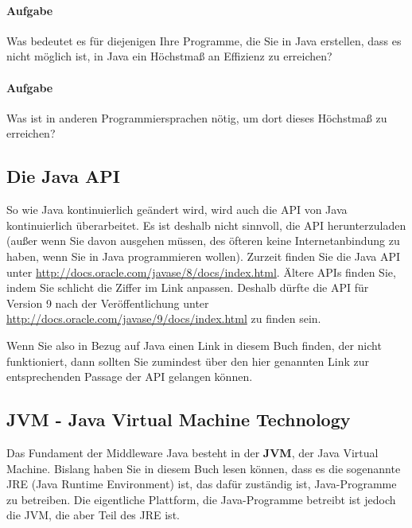 \paragraph{Aufgabe}

Was bedeutet es für diejenigen Ihre Programme, die Sie in Java erstellen, dass es nicht möglich ist, in Java ein Höchstmaß an Effizienz zu erreichen? 

\paragraph{Aufgabe}

Was ist in anderen Programmiersprachen nötig, um dort dieses Höchstmaß zu erreichen?

\subsection{Die Java API}

So wie Java kontinuierlich geändert wird, wird auch die API von Java kontinuierlich überarbeitet. Es ist deshalb nicht sinnvoll, die API herunterzuladen (außer wenn Sie davon ausgehen müssen, des öfteren keine Internetanbindung zu haben, wenn Sie in Java programmieren wollen). Zurzeit finden Sie die Java API unter \url{http://docs.oracle.com/javase/8/docs/index.html}. Ältere APIs finden Sie, indem Sie schlicht die Ziffer im Link anpassen. Deshalb dürfte die API für Version 9 nach der Veröffentlichung unter \url{http://docs.oracle.com/javase/9/docs/index.html} zu finden sein.

Wenn Sie also in Bezug auf Java einen Link in diesem Buch finden, der nicht funktioniert, dann sollten Sie zumindest über den hier genannten Link zur entsprechenden Passage der API gelangen können.

\subsection{JVM - Java Virtual Machine Technology}

Das Fundament der Middleware Java besteht in der \textbf{JVM}, der Java Virtual Machine. Bislang haben Sie in diesem Buch lesen können, dass es die sogenannte JRE (Java Runtime Environment) ist, das dafür zuständig ist, Java-Programme zu betreiben. Die eigentliche Plattform, die Java-Programme betreibt ist jedoch die JVM, die aber Teil des JRE ist.

